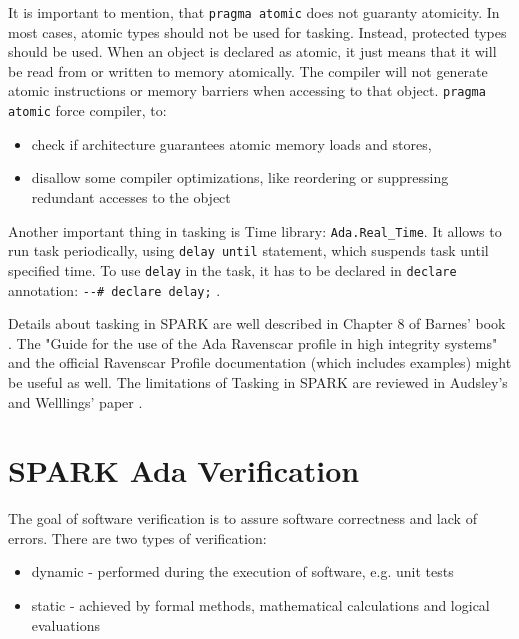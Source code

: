 It is important to mention, that \lstinline{pragma atomic} does not guaranty atomicity. In most cases, atomic types should not be used for tasking. Instead, protected types should be used. When an object is declared as atomic, it just means that it will be read from or written to memory atomically. The compiler will not generate atomic instructions or memory barriers when accessing to that object. \lstinline{pragma atomic} force compiler, to:
\begin{itemize}
	\item check if architecture guarantees atomic memory loads and stores,
	\item disallow some compiler optimizations, like reordering or suppressing redundant accesses to the object
\end{itemize}

Another important thing in tasking is Time library: \lstinline{Ada.Real_Time}. It allows to run task periodically, using \lstinline{delay until} statement, which suspends task until specified time. To use \lstinline{delay} in the task, it has to be declared in \lstinline{declare} annotation: \lstinline{--# declare delay;} \cite{Barnes:Book}.

Details about tasking in SPARK are well described in Chapter 8 of Barnes' book \cite{Barnes:Book}. The "Guide for the use of the Ada Ravenscar profile in high integrity systems" \cite{Ravenscar:Article} and the official Ravenscar Profile documentation (which includes examples) \cite{Ravenscar:Online} might be useful as well. The limitations of Tasking in SPARK are reviewed in Audsley's and Welllings' paper \cite{IssuesWithRavenscar:Paper}.



\section{SPARK Ada Verification}
\label{background:sparkverification}


The goal of software verification is to assure software correctness and lack of errors. There are two types of verification:
\begin{itemize}
	\item dynamic - performed during the execution of software, e.g. unit tests
	\item static - achieved by formal methods, mathematical calculations and logical evaluations
\end{itemize}

